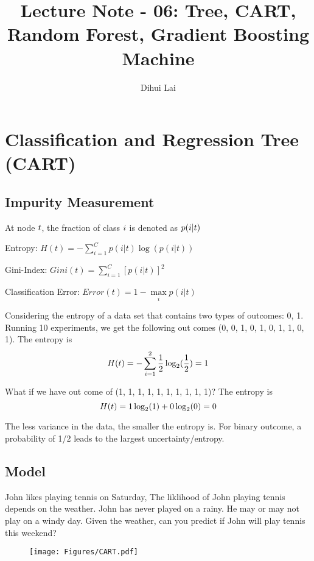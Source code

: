 \documentclass[12pt, oneside]{article}
\title{Lecture Note - 06: Tree, CART, Random Forest, Gradient Boosting Machine}
\author{Dihui Lai}
\begin{document}
\maketitle
\tableofcontents

\vspace{.25in}


\section{Classification and Regression Tree (CART)}

\subsection{Impurity Measurement}
At node $\mathnormal{t}$, the fraction of class $\mathnormal{i}$ is denoted as $\mathnormal{p(i|t)}$
    
Entropy: $H(t)=-\sum\limits_{i=1}^{C}p(i|t)\log(p(i|t))$
    
Gini-Index: $Gini(t)=\sum\limits_{i=1}^{C}[p(i|t)]^2$
    
Classification Error: $Error(t)=1-\max\limits_{i}p(i|t)$

Considering the entropy of a data set that contains two types of outcomes: {0, 1}. Running 10 experiments, we get the following out comes (0, 0, 1, 0, 1, 0, 1, 1, 0, 1). The entropy is 
$$
\mathnormal{ H(t)}=-\sum\limits_{i=1}^{2}\frac{1}{2}\log_2(\frac{1}{2})=1
$$
    
What if we have out come of (1, 1, 1, 1, 1, 1, 1, 1, 1, 1)? The entropy is 
$$
\mathnormal{H(t)}=1\log_2(1)+0\log_2(0)=0
$$

The less variance in the data, the smaller the entropy is. For binary outcome, a probability of 1/2 leads to the largest uncertainty/entropy.

\subsection{Model}
John likes playing tennis on Saturday, The liklihood of John playing tennis depends on the weather. John has never played on a rainy. He may or may not play on a windy day. Given the weather, can you predict if John will play tennis this weekend?

\begin{figure}
\center
\texttt{[image: Figures/CART.pdf]}
\end{figure}
\end{document}

